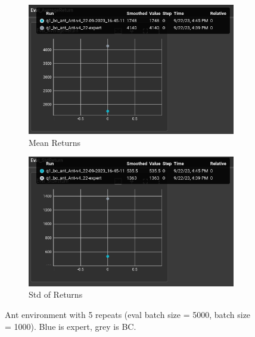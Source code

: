 \documentclass[11pt]{article}
\begin{document}
\begin{figure}[h]
    \centering
    \begin{subfigure}[b]{0.47\textwidth}
        \centering
        \includegraphics[width=\textwidth]{09-22-ant_mean}
        \caption{Mean Returns}
        \label{fig:ant_mean}
    \end{subfigure}
    \hfill
    \begin{subfigure}[b]{0.47\textwidth}
        \centering
        \includegraphics[width=\textwidth]{09-22-ant_std}
        \caption{Std of Returns}
        \label{fig:ant_std}
    \end{subfigure}
    \caption{Ant environment with 5 repeats (eval batch size = 5000, batch size = 1000). Blue is expert, grey is BC.}
    \label{fig:ant}
\end{figure}
\end{document}
